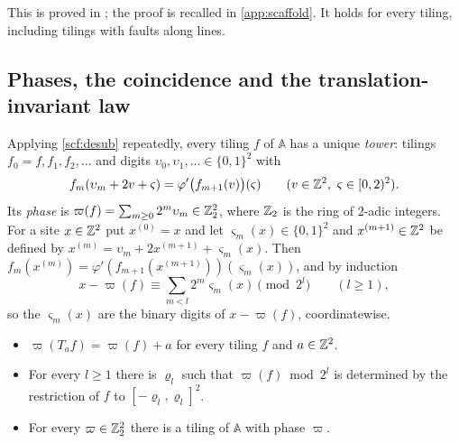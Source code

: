 This is proved in \cite{DM26forget}; the proof is recalled in \cref{app:scaffold}. It holds for every tiling, including tilings with faults along lines.

\subsection{Phases, the coincidence and the translation-invariant law}\label{scf:sub-phase}

Applying \cref{scf:desub} repeatedly, every tiling $f$ of $\mathbb A$ has a unique \emph{tower}: tilings $f_0=f,f_1,f_2,\dots$ and digits $\upsilon_0,\upsilon_1,\dots\in\{0,1\}^2$ with
\[
f_m(\upsilon_m+2v+\varsigma)=\varphi'\bigl(f_{m+1}(v)\bigr)(\varsigma)\qquad(v\in\Z^2,\ \varsigma\in[0,2)^2).
\]
Its \emph{phase} is $\varpi(f)=\sum_{m\ge0}2^m\upsilon_m\in\mathbb{Z}_2^2$, where $\mathbb{Z}_2$ is the ring of $2$-adic integers. For a site $x\in\mathbb{Z}^2$ put $x^{(0)}=x$ and let $\varsigma_m(x)\in\{0,1\}^2$ and $x^{(m+1)}\in\mathbb{Z}^2$ be defined by $x^{(m)}=\upsilon_m+2x^{(m+1)}+\varsigma_m(x)$. Then $f_m(x^{(m)})=\varphi'(f_{m+1}(x^{(m+1)}))(\varsigma_m(x))$, and by induction
\begin{equation}\label{scf:eq-digits}
x-\varpi(f)\equiv\sum_{m<l}2^m\varsigma_m(x)\pmod{2^l}\qquad(l\ge1),
\end{equation}
so the $\varsigma_m(x)$ are the binary digits of $x-\varpi(f)$, coordinatewise.

\begin{lemma}[Phases]\label{scf:phase}
\begin{itemize}
\item[(a)] $\varpi(T_af)=\varpi(f)+a$ for every tiling $f$ and $a\in\mathbb{Z}^2$.
\item[(b)] For every $l\ge1$ there is $\varrho_l$ such that $\varpi(f)\bmod 2^l$ is determined by the restriction of $f$ to $[-\varrho_l,\varrho_l]^2$.
\item[(c)] For every $\varpi\in\mathbb{Z}_2^2$ there is a tiling of $\mathbb A$ with phase $\varpi$.
\end{itemize}
\end{lemma}

